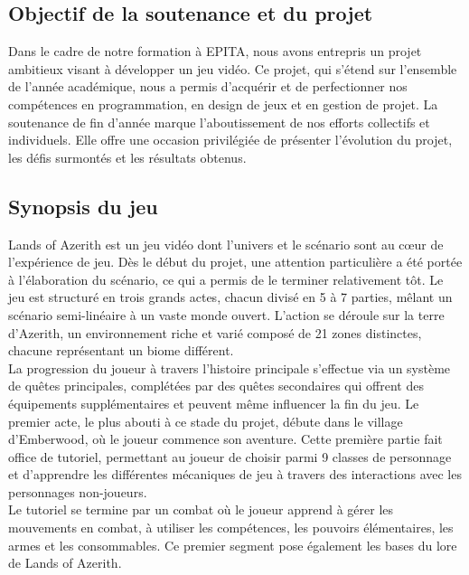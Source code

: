 

\subsection{Objectif de la soutenance et du projet}

Dans le cadre de notre formation à EPITA, nous avons entrepris un projet ambitieux visant à développer un jeu vidéo.
Ce projet, qui s'étend sur l'ensemble de l'année académique, nous a permis d'acquérir et de perfectionner nos compétences en programmation, en design de jeux et en gestion de projet.
La soutenance de fin d'année marque l'aboutissement de nos efforts collectifs et individuels.
Elle offre une occasion privilégiée de présenter l'évolution du projet, les défis surmontés et les résultats obtenus.

\subsection{Synopsis du jeu}

Lands of Azerith est un jeu vidéo dont l'univers et le scénario sont au cœur de l'expérience de jeu. 
Dès le début du projet, une attention particulière a été portée à l'élaboration du scénario, ce qui a permis de le terminer relativement tôt. 
Le jeu est structuré en trois grands actes, chacun divisé en 5 à 7 parties, mêlant un scénario semi-linéaire à un vaste monde ouvert. 
L'action se déroule sur la terre d'Azerith, un environnement riche et varié composé de 21 zones distinctes, chacune représentant un biome différent.
\\

La progression du joueur à travers l'histoire principale s'effectue via un système de quêtes principales, complétées par des quêtes secondaires qui offrent des équipements supplémentaires et peuvent même influencer la fin du jeu. 
Le premier acte, le plus abouti à ce stade du projet, débute dans le village d'Emberwood, où le joueur commence son aventure. 
Cette première partie fait office de tutoriel, permettant au joueur de choisir parmi 9 classes de personnage et d'apprendre les différentes mécaniques de jeu à travers des interactions avec les personnages non-joueurs.
\\

Le tutoriel se termine par un combat où le joueur apprend à gérer les mouvements en combat, à utiliser les compétences, les pouvoirs élémentaires, les armes et les consommables. 
Ce premier segment pose également les bases du lore de Lands of Azerith.
\\

